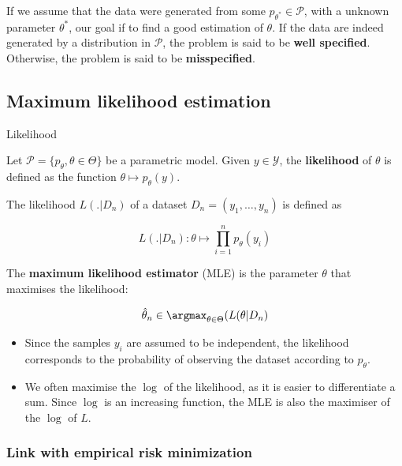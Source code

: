 \documentclass[
10pt, %
a4paper, %
oneside, %
headinclude,footinclude, %
BCOR5mm, %
]{scrartcl}
\begin{document}
If we assume that the data were generated from some $p_{\theta^*}\in \mathcal{P} $, with a unknown parameter $ \theta^*$, our goal if to find a good estimation of $\theta$. If the data are indeed generated by a distribution in $ \mathcal{P} $, the problem is said to be \textbf{{well specified}}. Otherwise, the problem is said to be \textbf{{misspecified}}.

\subsection{\large\color{MidnightBlue}Maximum likelihood estimation}

\begin{definition}{Likelihood}

    Let $\mathcal{P}  = \{p_{\theta},\theta \in \Theta \}$ be a parametric model. Given $y\in \mathcal{Y} $, the \textbf{{likelihood}} of $\theta$ is defined as the function $ \theta\mapsto p_{\theta}(y)$.

    The likelihood $L(.|D_n)$ of a dataset $D_n = (y_1, \dots, y_n)$ is defined as

    \begin{equation*}
	L(.|D_n):\theta\mapsto \prod^{n}_{i=1} p_{\theta}(y_i)
    \end{equation*}

    The \textbf{{maximum likelihood estimator}}  (MLE) is the parameter $\theta$ that maximises the likelihood:

    \begin{equation*}
	\hat{\theta}_n \in \argmax_{\theta\in \Theta}( L(\theta|D_n)
    \end{equation*}

\end{definition}

\begin{remark}
    \begin{itemize}
        \item Since the samples $y_i$ are assumed to be independent, the likelihood corresponds to the probability of observing the dataset according to $p_{\theta}$.
	\item We often maximise the $\log$ of the likelihood, as it is easier to differentiate a sum. Since $\log$ is an increasing function, the MLE is also the maximiser of the $\log$ of $L$.
    \end{itemize}
\end{remark}

\subsubsection{\large\color{Periwinkle}Link with empirical risk minimization}
\end{document}
